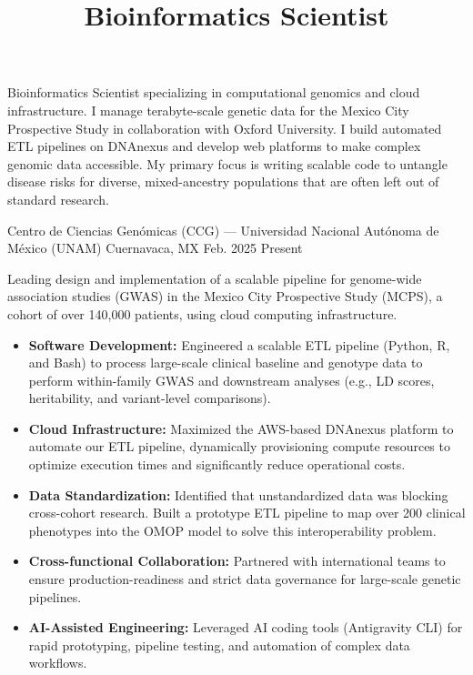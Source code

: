 \documentclass[10pt]{simplecv}
\title{Bioinformatics Scientist}
\begin{document}
\setmainfont{Inter} %
\setsansfont{XCharter} %
\makecvheader{}
\thispagestyle{firstpage}

{\small
Bioinformatics Scientist specializing in computational genomics and cloud infrastructure. I manage terabyte-scale genetic data for the Mexico City Prospective Study in collaboration with Oxford University. I build automated ETL pipelines on DNAnexus and develop web platforms to make complex genomic data accessible. My primary focus is writing scalable code to untangle disease risks for diverse, mixed-ancestry populations that are often left out of standard research.
}
\vspace{0.5cm}


    {Centro de Ciencias Genómicas (CCG) --- Universidad Nacional Autónoma de México (UNAM)}
    {Cuernavaca, MX}
    {Feb. 2025}
    {Present}
    {
        Leading design and implementation of a scalable pipeline for genome-wide association studies (GWAS) in the Mexico City Prospective Study (MCPS), a cohort of over 140,000 patients, using cloud computing infrastructure.

        \begin{itemize}[leftmargin=*]
        \setlength{\itemsep}{0cm}

          \item \textbf{Software Development:} Engineered a scalable ETL pipeline (Python, R, and Bash) to process large-scale clinical baseline and genotype data to perform within-family GWAS and downstream analyses (e.g., LD scores, heritability, and variant-level comparisons).

          \item \textbf{Cloud Infrastructure:} Maximized the AWS-based DNAnexus platform to automate our ETL pipeline, dynamically provisioning compute resources to optimize execution times and significantly reduce operational costs.

          \item \textbf{Data Standardization:} Identified that unstandardized data was blocking cross-cohort research. Built a prototype ETL pipeline to map over 200 clinical phenotypes into the OMOP model to solve this interoperability problem.

          \item \textbf{Cross-functional Collaboration:} Partnered with international teams to ensure production-readiness and strict data governance for large-scale genetic pipelines.

          \item \textbf{AI-Assisted Engineering:} Leveraged AI coding tools (Antigravity CLI) for rapid prototyping, pipeline testing, and automation of complex data workflows.
        \end{itemize}
    }
\end{document}
